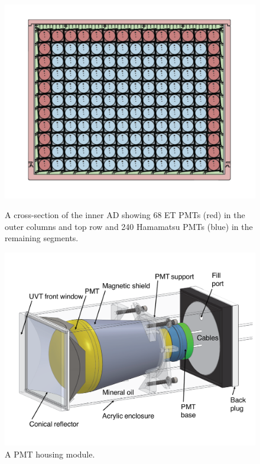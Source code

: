\begin{figure}[h]
	\centering
	\begin{minipage}[t]{0.48\linewidth}
		\centering
		\includegraphics[width=0.95\linewidth]{tex/4-prospect-images/ADCrossSection}
		\caption{A cross-section of the inner AD showing 68 ET PMTs (red) in the outer columns and top row and 240 Hamamatsu PMTs (blue) in the remaining segments.}
		\label{fig:adcrosssection}
	\end{minipage}
	\begin{minipage}[t]{0.48\linewidth}
		\centering
		\includegraphics[width=0.95\linewidth]{tex/4-prospect-images/PMTHousing}
		\caption{A PMT housing module.}
		\label{fig:pmthousing}
	\end{minipage}
\end{figure}


